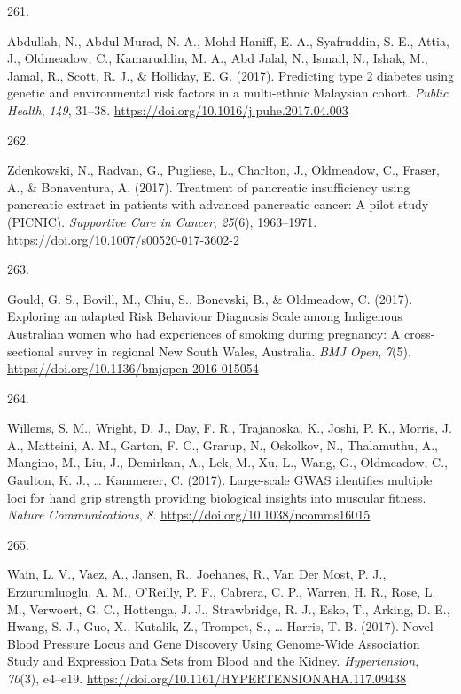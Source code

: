 \documentclass[11pt, a4paper]{awesome-cv}
\newlength{\csllabelwidth}
\newcommand{\CSLLeftMargin}[1]{\parbox[t]{\csllabelwidth}{#1}}
\newcommand{\CSLRightInline}[1]{\parbox[t]{\linewidth - \csllabelwidth}{#1}}
\begin{document}
\leavevmode\hypertarget{ref-abdullah_predicting_2017}{}%
\CSLLeftMargin{261. }
\CSLRightInline{Abdullah, N., Abdul Murad, N. A., Mohd Haniff, E. A.,
Syafruddin, S. E., Attia, J., Oldmeadow, C., Kamaruddin, M. A., Abd
Jalal, N., Ismail, N., Ishak, M., Jamal, R., Scott, R. J., \& Holliday,
E. G. (2017). Predicting type 2 diabetes using genetic and environmental
risk factors in a multi-ethnic Malaysian cohort. \emph{Public Health},
\emph{149}, 31--38. \url{https://doi.org/10.1016/j.puhe.2017.04.003}}

\leavevmode\hypertarget{ref-zdenkowski_treatment_2017}{}%
\CSLLeftMargin{262. }
\CSLRightInline{Zdenkowski, N., Radvan, G., Pugliese, L., Charlton, J.,
Oldmeadow, C., Fraser, A., \& Bonaventura, A. (2017). Treatment of
pancreatic insufficiency using pancreatic extract in patients with
advanced pancreatic cancer: A pilot study (PICNIC). \emph{Supportive
Care in Cancer}, \emph{25}(6), 1963--1971.
\url{https://doi.org/10.1007/s00520-017-3602-2}}

\leavevmode\hypertarget{ref-gould_exploring_2017}{}%
\CSLLeftMargin{263. }
\CSLRightInline{Gould, G. S., Bovill, M., Chiu, S., Bonevski, B., \&
Oldmeadow, C. (2017). Exploring an adapted Risk Behaviour Diagnosis
Scale among Indigenous Australian women who had experiences of smoking
during pregnancy: A cross-sectional survey in regional New South Wales,
Australia. \emph{BMJ Open}, \emph{7}(5).
\url{https://doi.org/10.1136/bmjopen-2016-015054}}

\leavevmode\hypertarget{ref-willems_large-scale_2017}{}%
\CSLLeftMargin{264. }
\CSLRightInline{Willems, S. M., Wright, D. J., Day, F. R., Trajanoska,
K., Joshi, P. K., Morris, J. A., Matteini, A. M., Garton, F. C., Grarup,
N., Oskolkov, N., Thalamuthu, A., Mangino, M., Liu, J., Demirkan, A.,
Lek, M., Xu, L., Wang, G., Oldmeadow, C., Gaulton, K. J., \ldots{}
Kammerer, C. (2017). Large-scale GWAS identifies multiple loci for hand
grip strength providing biological insights into muscular fitness.
\emph{Nature Communications}, \emph{8}.
\url{https://doi.org/10.1038/ncomms16015}}

\leavevmode\hypertarget{ref-wain_novel_2017}{}%
\CSLLeftMargin{265. }
\CSLRightInline{Wain, L. V., Vaez, A., Jansen, R., Joehanes, R., Van Der
Most, P. J., Erzurumluoglu, A. M., O'Reilly, P. F., Cabrera, C. P.,
Warren, H. R., Rose, L. M., Verwoert, G. C., Hottenga, J. J.,
Strawbridge, R. J., Esko, T., Arking, D. E., Hwang, S. J., Guo, X.,
Kutalik, Z., Trompet, S., \ldots{} Harris, T. B. (2017). Novel Blood
Pressure Locus and Gene Discovery Using Genome-Wide Association Study
and Expression Data Sets from Blood and the Kidney. \emph{Hypertension},
\emph{70}(3), e4--e19.
\url{https://doi.org/10.1161/HYPERTENSIONAHA.117.09438}}
\end{document}
